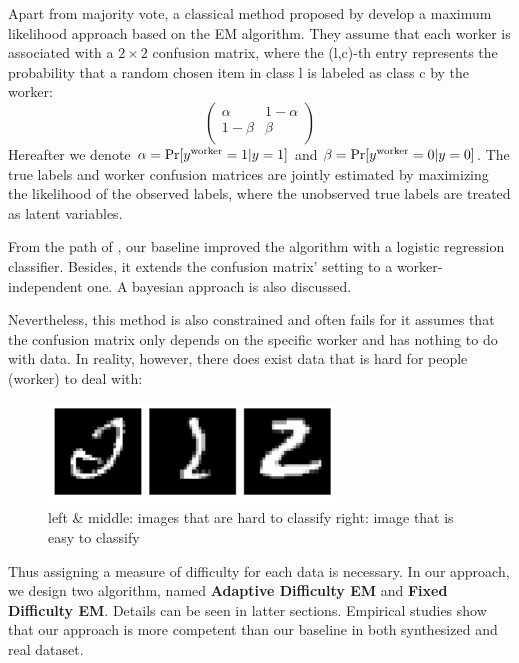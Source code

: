 \documentclass{article}
\begin{document}
Apart from majority vote, a classical method proposed by \cite{dawid1979maximum} develop  a maximum likelihood approach based on the EM algorithm. They assume that each worker is associated with a $2\times 2$ confusion matrix, where the (l,c)-th entry represents the probability that a random chosen item in class l is labeled as class c by the worker: 
\begin{displaymath}
\left( \begin{array}{cc}
\alpha & 1-\alpha \\
1-\beta & \beta  \\
\end{array} \right)
\end{displaymath}
Hereafter we denote $\alpha=\textup{Pr}[y^{\mathrm{worker}}=1|y=1]$ and $\beta=\textup{Pr}[y^{\mathrm{worker}}=0|y=0]$. The true labels and worker confusion matrices are jointly estimated by maximizing the likelihood of the observed labels, where the unobserved true labels are treated as latent variables.

From the path of \cite{dawid1979maximum}, our baseline \cite{raykar2010learning} improved the algorithm with a logistic regression classifier. Besides, it extends the confusion matrix' setting to a worker-independent one. A bayesian approach is also discussed.

Nevertheless, this method is also constrained and often fails for it assumes that the confusion matrix only depends on the specific worker and has nothing to do with data. In reality, however, there does exist data that is hard for people (worker) to deal with:

\begin{figure}[H]
    \centering
    \includegraphics[width=3in]{image/MNIST_confused_example1.png}
    \caption{left \& middle: images that are hard to classify \quad right: image that is easy to classify} 
    \label{fig:MNIST_confused_example1}
\end{figure}

Thus assigning a measure of difficulty for each data is necessary. In our approach, we design two algorithm, named \textbf{Adaptive Difficulty EM} and \textbf{Fixed Difficulty EM}. Details can be seen in latter sections. Empirical studies show that our approach is more competent than our baseline in both synthesized and real dataset.
\end{document}
